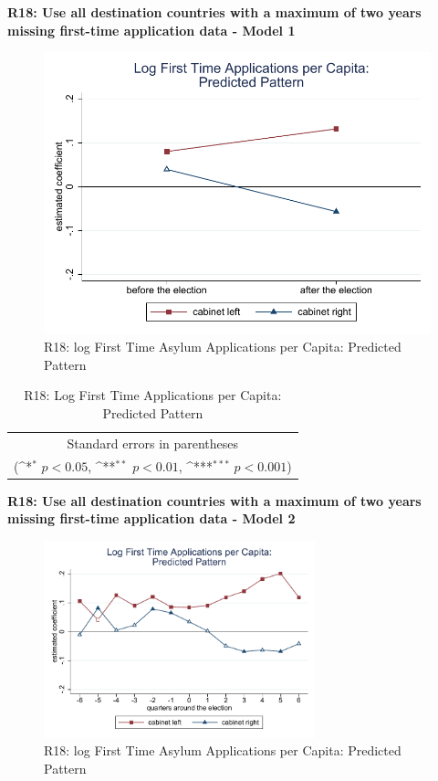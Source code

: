 \documentclass[10pt,a4paper]{scrartcl}
\begin{document}
\clearpage
\textbf{R18: Use all destination countries with a maximum of two years missing first-time application data - Model 1}
\begin{figure}[!ht]
	\centering
	\includegraphics[width=1\textwidth]{figures_edited/app_graph1_R18.pdf}
	\caption{R18: log First Time Asylum Applications per Capita: Predicted Pattern}
\end{figure}

\begin{table}[!ht]\centering
	\renewcommand{\arraystretch}{1.25}
	\def\sym#1{\ifmmode^{#1}\else\(^{#1}\)\fi}
	\caption{R18: Log First Time Applications per Capita: Predicted Pattern}
	\begin{tabular}{l*{2}{c}}
		\hline\hline
		
		\hline\hline
		\multicolumn{3}{c}{\footnotesize Standard errors in parentheses} \\
		\multicolumn{3}{c}{\footnotesize (\sym{*} \(p<0.05\), \sym{**} \(p<0.01\), \sym{***} \(p<0.001\))}\\
	\end{tabular}
\end{table}

\clearpage
\textbf{R18: Use all destination countries with a maximum of two years missing first-time application data - Model 2}
\begin{figure}[!ht]
	\centering
	\includegraphics[width=0.7\textwidth]{figures_edited/app_graph2_R18.pdf}
	\caption{R18: log First Time Asylum Applications per Capita: Predicted Pattern}
\end{figure}
\end{document}
